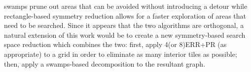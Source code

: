 swamps prune out areas that can be avoided without introducing a detour while 
rectangle-based symmetry reduction allows for a faster exploration of areas that need to be searched.
Since it appears that the two algorithms are orthogonal, a natural extension of this work would 
be to create a new symmetry-based search space reduction which combines the two: 
first, apply 4(or 8)ERR+PR (as appropriate) to a grid in order to eliminate as many interior tiles 
as possible; then, apply a swamps-based decomposition to the resultant graph.
